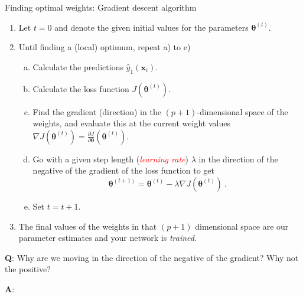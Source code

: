 \documentclass[
  10pt,
  ignorenonframetext,
]{beamer}
\providecommand{\tightlist}{%
  \setlength{\itemsep}{0pt}\setlength{\parskip}{0pt}}
\begin{document}
\begin{frame}
\begin{block}{Finding optimal weights: Gradient descent algorithm}
\protect\hypertarget{finding-optimal-weights-gradient-descent-algorithm}{}
\vspace{2mm}

\begin{enumerate}
\tightlist
\item
  Let \(t=0\) and denote the given initial values for the parameters
  \({\boldsymbol \theta}^{(t)}\). \vspace{2mm}
\item
  Until finding a (local) optimum, repeat a) to e)

  \begin{enumerate}
  [a)]
  \tightlist
  \item
    Calculate the predictions \({\hat{y}_1({\boldsymbol x}_i)}\).
  \item
    Calculate the loss function \(J({\boldsymbol \theta}^{(t)})\).
  \item
    Find the gradient (direction) in the \((p+1)\)-dimensional space of
    the weights, and evaluate this at the current weight values
    \(\nabla J({\boldsymbol \theta}^{(t)})={\frac{\partial J}{\partial {\boldsymbol \theta}}}({\boldsymbol \theta}^{(t)})\).
  \item
    Go with a given step length (\emph{\textcolor{red}{learning rate}})
    \(\lambda\) in the direction of the negative of the gradient of the
    loss function to get
    \[{\boldsymbol \theta}^{(t+1)}={\boldsymbol \theta}^{(t)} - \lambda \nabla J({\boldsymbol \theta}^{(t)}) \ .\]
  \item
    Set \(t=t+1\). \vspace{2mm}
  \end{enumerate}
\item
  The final values of the weights in that \((p+1)\) dimensional space
  are our parameter estimates and your network is \emph{trained}.
\end{enumerate}
\end{block}
\end{frame}

\begin{frame}
\textbf{Q}: Why are we moving in the direction of the negative of the
gradient? Why not the positive?

\textbf{A}:
\end{frame}
\end{document}
